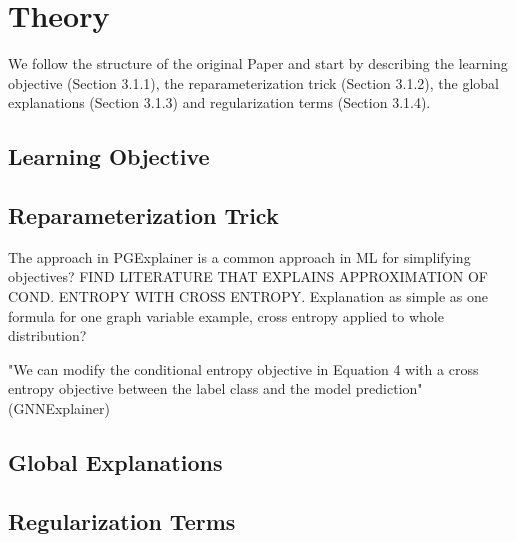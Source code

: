\section{Theory}
We follow the structure of the original Paper\cite{} and start by describing the learning objective (Section 3.1.1), the reparameterization trick (Section 3.1.2), the global explanations (Section 3.1.3) and regularization terms (Section 3.1.4).

\subsection{Learning Objective}

\subsection{Reparameterization Trick}
The approach in PGExplainer is a common approach in ML for simplifying objectives? FIND LITERATURE THAT EXPLAINS APPROXIMATION OF COND. ENTROPY WITH CROSS ENTROPY. Explanation as simple as one formula for one graph variable example, cross entropy applied to whole distribution? \bigskip

"We can modify the conditional entropy objective in Equation 4 with a cross entropy objective between the label class and the model prediction" (GNNExplainer)


\subsection{Global Explanations}

\subsection{Regularization Terms}

